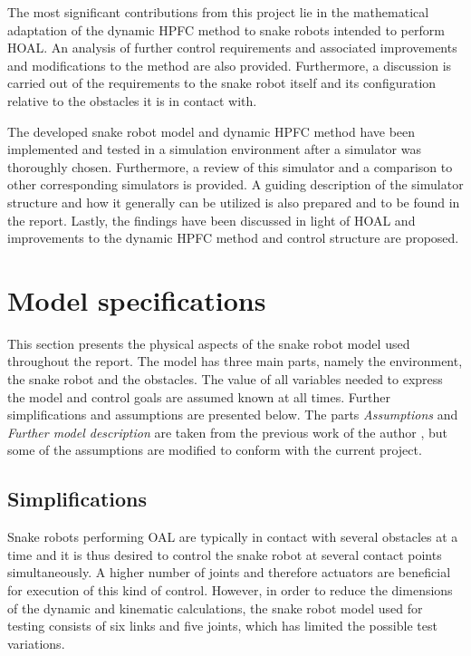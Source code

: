 The most significant contributions from this project lie in the mathematical adaptation of the dynamic HPFC method to snake robots intended to perform HOAL. An analysis of further control requirements and associated improvements and modifications to the method are also provided. Furthermore, a discussion is carried out of the requirements to the snake robot itself and its configuration relative to the obstacles it is in contact with.

The developed snake robot model and dynamic HPFC method have been implemented and tested in a simulation environment after a simulator was thoroughly chosen. Furthermore, a review of this simulator and a comparison to other corresponding simulators is provided. A guiding description of the simulator structure and how it generally can be utilized is also prepared and to be found in the report. Lastly, the findings have been discussed in light of HOAL and improvements to the dynamic HPFC method and control structure are proposed.


\section{Model specifications} \label{ch:model_specs}

This section presents the physical aspects of the snake robot model used throughout the report. The model has three main parts, namely the environment, the snake robot and the obstacles. The value of all variables needed to express the model and control goals are assumed known at all times. Further simplifications and assumptions are presented below. The parts \textit{Assumptions} and \textit{Further model description} are taken from the previous work of the author \cite{AtussaProsjektoppgp}, but some of the assumptions are modified to conform with the current project.

\subsection{Simplifications}

Snake robots performing OAL are typically in contact with several obstacles at a time and it is thus desired to control the snake robot at several contact points simultaneously. A higher number of joints and therefore actuators are beneficial for execution of this kind of control. However, in order to reduce the dimensions of the dynamic and kinematic calculations, the snake robot model used for testing consists of six links and five joints, which has limited the possible test variations.


